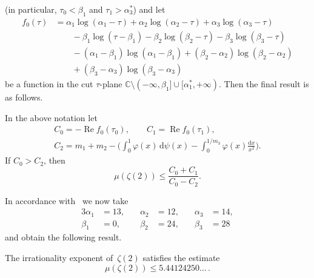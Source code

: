 \documentclass[a4paper,twoside]{article}
\numberwithin{equation}{section}
\renewcommand{\[}{\lfloor}
\renewcommand{\]}{\rfloor}
\newcommand{\<}{\langle}
\renewcommand{\>}{\rangle}
\renewcommand{\phi}{\varphi}
\renewcommand{\d}{\mathrm{d}}
\DeclareMathOperator{\Real}{Re}
\renewcommand{\Re}{\Real}
\newcommand{\rom}[1]{{\rm#1}}
\begin{document}
(in particular, $\tau_0<\beta_1$ and $\tau_1>\alpha_3^*$)
and let
\begin{align*}
f_0(\tau)
&=\alpha_1\log(\alpha_1-\tau)
+\alpha_2\log(\alpha_2-\tau)
+\alpha_3\log(\alpha_3-\tau)
\\ &\qquad
-\beta_1\log(\tau-\beta_1)
-\beta_2\log(\beta_2-\tau)
-\beta_3\log(\beta_3-\tau)
\\ &\qquad
-(\alpha_1-\beta_1)\log(\alpha_1-\beta_1)
+(\beta_2-\alpha_2)\log(\beta_2-\alpha_2)
\\ &\qquad
+(\beta_3-\alpha_3)\log(\beta_3-\alpha_3)
\end{align*}
be a function in the cut $\tau$-plane
$\mathbb C\setminus(-\infty,\beta_1]\cup[\alpha_1^*,+\infty)$.
Then the final result is as follows.

\begin{proposition}
\label{prop:4}
In the above notation let
$$
\begin{gathered}
C_0=-\Re f_0(\tau_0), \qquad C_1=\Re f_0(\tau_1),
\\
C_2=m_1+m_2
-\biggl(\int_0^1\phi(x)\,\d\psi(x)
-\int_0^{1/m_3}\phi(x)\frac{\d x}{x^2}\biggr).
\end{gathered}
$$
If $C_0>C_2$\rom, then
$$
\mu(\zeta(2))\le\frac{C_0+C_1}{C_0-C_2}.
$$
\end{proposition}

In accordance with~\cite{RV2} we now take
\begin{equation}
\begin{alignedat}{3}{3}
\alpha_1&=13, \quad& \alpha_2&=12, \quad& \alpha_3&=14,
\\
\beta_1&=0, \quad& \beta_2&=24, \quad& \beta_3&=28
\end{alignedat}
\label{eq:6.8}
\end{equation}
and obtain the following result.

\begin{theorem}
\label{th:2}
The irrationality exponent of~$\zeta(2)$ satisfies the estimate
\begin{equation}
\mu(\zeta(2))\le5.44124250\dots\,.
\label{eq:6.9}
\end{equation}
\end{theorem}
\end{document}
